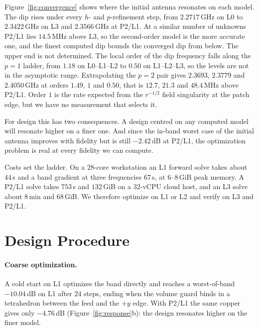 \documentclass{anvil-paper}
\newcommand{\PL}{P2/L1}
\begin{document}
Figure~\ref{fig:convergence} shows where the initial antenna resonates on
each model. The dip rises under every $h$- and $p$-refinement step, from
$2.2717$\,GHz on L0 to $2.3422$\,GHz on L3 and $2.3566$\,GHz at \PL. At a
similar number of unknowns \PL{} lies $14.5$\,MHz above L3, so the
second-order model is the more accurate one, and the finest computed dip
bounds the converged dip from below. The upper end is not determined. The
local order of the dip frequency falls along the $p = 1$ ladder, from
$1.18$ on L0--L1--L2 to $0.50$ on L1--L2--L3, so the levels are not in the
asymptotic range. Extrapolating the $p = 2$ pair gives $2.3693$,
$2.3779$ and $2.4050$\,GHz at orders $1.49$, $1$ and $0.50$, that is
$12.7$, $21.3$ and $48.4$\,MHz above \PL. Order $1$ is the rate expected
from the $r^{-1/2}$ field singularity at the patch edge, but we have no
measurement that selects it.

For design this has two consequences. A design centred on any computed
model will resonate higher on a finer one. And since the in-band worst
case of the initial antenna improves with fidelity but is still $-2.42$\,dB
at \PL, the optimization problem is real at every fidelity we can compute.

Costs set the ladder. On a $28$-core workstation an L1 forward solve takes
about $44$\,s and a band gradient at three frequencies $67$\,s, at
$6$--$8$\,GiB peak memory. A \PL{} solve takes $753$\,s and $132$\,GiB on
a $32$-vCPU cloud host, and an L3 solve about $8$\,min and $68$\,GiB. We
therefore optimize on L1 or L2 and verify on L3 and \PL.

\section{Design Procedure}
\label{sec:procedure}

\paragraph{Coarse optimization.}
A cold start on L1 optimizes the band directly and reaches a worst-of-band
$-10.04$\,dB on L1 after $24$ steps, ending when the volume guard binds in
a tetrahedron between the feed and the $+y$ edge. With \PL{} the same
copper gives only $-4.76$\,dB (Figure~\ref{fig:response}b): the design
resonates higher on the finer model.
\end{document}
